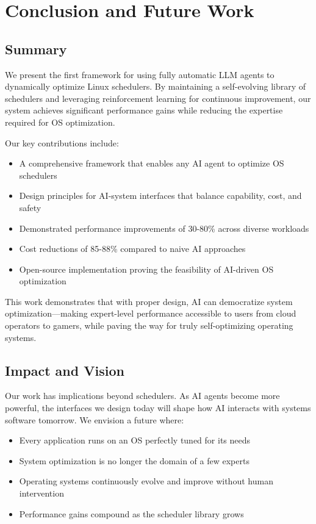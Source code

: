\section{Conclusion and Future Work}

\subsection{Summary}

We present the first framework for using fully automatic LLM agents to dynamically optimize Linux schedulers. By maintaining a self-evolving library of schedulers and leveraging reinforcement learning for continuous improvement, our system achieves significant performance gains while reducing the expertise required for OS optimization. 

Our key contributions include:
\begin{itemize}
\item A comprehensive framework that enables any AI agent to optimize OS schedulers
\item Design principles for AI-system interfaces that balance capability, cost, and safety
\item Demonstrated performance improvements of 30-80\% across diverse workloads
\item Cost reductions of 85-88\% compared to naive AI approaches
\item Open-source implementation proving the feasibility of AI-driven OS optimization
\end{itemize}

This work demonstrates that with proper design, AI can democratize system optimization—making expert-level performance accessible to users from cloud operators to gamers, while paving the way for truly self-optimizing operating systems.

\subsection{Impact and Vision}

Our work has implications beyond schedulers. As AI agents become more powerful, the interfaces we design today will shape how AI interacts with systems software tomorrow. We envision a future where:

\begin{itemize}
\item Every application runs on an OS perfectly tuned for its needs
\item System optimization is no longer the domain of a few experts
\item Operating systems continuously evolve and improve without human intervention
\item Performance gains compound as the scheduler library grows
\end{itemize}

